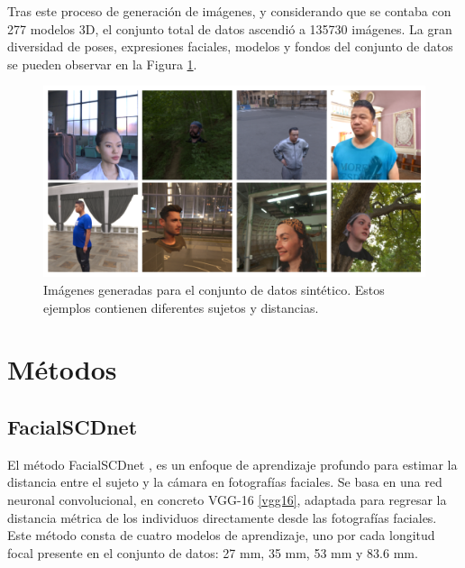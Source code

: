 Tras este proceso de generación de imágenes, y considerando que se contaba con 277 modelos 3D, el conjunto total de datos ascendió a 135730 imágenes. La gran diversidad de poses, expresiones faciales, modelos y fondos del conjunto de datos se pueden observar en la Figura \ref{fig24}.


\begin{figure}[h]
	\centering
	\includegraphics[scale=0.4]{imagenes/cap4/ejemplos_dataset.png}
	\caption[Ejemplos de imágenes generadas para el conjunto de datos.]{Imágenes generadas para el conjunto de datos sintético. Estos ejemplos contienen diferentes sujetos y distancias.}
	\label{fig24}
\end{figure}

\section{Métodos}


\subsection{FacialSCDnet}\label{fscdnet}

El método FacialSCDnet \cite{14}, es un enfoque de aprendizaje profundo para estimar la distancia entre el sujeto y la cámara en fotografías faciales. Se basa en una red neuronal convolucional, en concreto VGG-16 \ref{vgg16}, adaptada para regresar la distancia métrica de los individuos directamente desde las fotografías faciales. Este método consta de cuatro modelos de aprendizaje, uno por cada longitud focal presente en el conjunto de datos: 27 mm, 35 mm, 53 mm y 83.6 mm.

